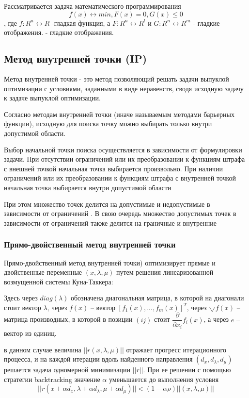 \documentclass[12pt,a4paper]{article}
\begin{document}
	Рассматривается задача математического программирования
	\begin{equation}\label{eq:0}
		f(x) \longleftrightarrow min, F(x) = 0, G(x) \leq 0
	\end{equation}
, где $f:R^n \longleftrightarrow R$ -гладкая функция, а $F:R^n \longleftrightarrow R^l$ и $G:R^n \longleftrightarrow R^m$ - гладкие отображения.
	- гладкие отображения.
	\subsection{Метод внутренней точки (IP)}
	Метод внутренней точки - это метод позволяющий решать задачи выпуклой оптимизации с условиями, заданными в виде неравенств, сводя исходную задачу к задаче выпуклой оптимизации.
	
	Согласно методам внутренней точки (иначе называемым методами барьерных функции), исходную для поиска точку можно выбирать только внутри допустимой области.
	
	Выбор начальной точки поиска осуществляется в зависимости от формулировки задачи. При отсутствии ограничений или их преобразовании к функциям штрафа с внешней точкой начальная точка выбирается произвольно. При наличии ограничений или их преобразовании к функциям штрафа с внутренней точкой начальная точка выбирается внутри допустимой области
	
	При этом множество точек делится на допустимые и недопустимые в зависимости от ограничений . В свою очередь множество допустимых точек в зависимости от ограничений также делится на граничные и внутренние
	
	\subsubsection{Прямо-двойственный метод внутренней точки}
	Прямо-двойственный метод внутренней точки) оптимизирует прямые и двойственные переменные $(x, \lambda, \mu)$ путем
	решения линеаризованной возмущенной системы Куна-Таккера:

	
	Здесь через $diag(\lambda)$ обозначена диагональная матрица, в которой на диагонали стоит вектор $\lambda$, через $f(x)$ – 
	вектор $[f_1(x), . . . , f_m(x)]^T$, через $\bigtriangledown f(x)$ – матрица производных, в которой в позиции $(ij)$ стоит $\dfrac{\partial}{\partial x_i}f_i(x)$, а через
	$e$ – вектор из единиц.
	
	в данном случае величина $||r(x, \lambda, \mu)||$ отражает прогресс итерационного процесса, и на каждой итерации вдоль найденного направления $(d_x, d_\lambda, d_\mu)$ решается задача
	одномерной минимизации $||r||$. При ее решении с помощью стратегии backtracking значение $\alpha$ уменьшается до
	выполнения условия
	\begin{equation}
		||r(x + \alpha d_x, \lambda +\alpha d_\lambda, \mu + \alpha d_\mu)|| < (1 − \alpha \rho)||(x, \lambda, \mu)||
	\end{equation}
		
\end{document}

